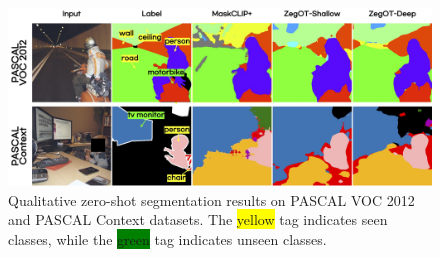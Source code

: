 \documentclass[nohyperref]{article}
\theoremstyle{plain}
\theoremstyle{definition}
\theoremstyle{remark}
\begin{document}
\begin{figure}[!t]
\vskip 0.1in
\begin{center}
\includegraphics[width=0.97\linewidth]{fig/seg_appen2.jpg}
\caption{Qualitative zero-shot segmentation results on PASCAL VOC 2012 and PASCAL Context datasets. The  \colorbox{yellow}{yellow} tag indicates seen classes, while the \colorbox{green}{green} tag indicates unseen classes. }
\label{fig_seg_appen2}
\end{center}
\vskip -0.1in
\end{figure}


\end{document}
